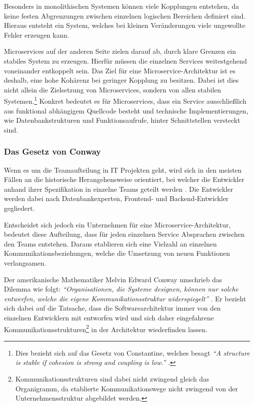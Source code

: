 Besonders in monolithischen Systemen können viele Kopplungen entstehen, da keine festen Abgrenzungen zwischen einzelnen logischen Bereichen definiert sind. Hieraus entsteht ein System, welches bei kleinen Veränderungen viele ungewollte Fehler erzeugen kann.

Microservices auf der anderen Seite zielen darauf ab, durch klare Grenzen ein stabiles System zu erzeugen. Hierfür müssen die einzelnen Services weitestgehend voneinander entkoppelt sein. Das Ziel für eine Microservice-Architektur ist es deshalb, eine hohe Kohärenz bei geringer Kopplung zu besitzen. Dabei ist dies nicht allein die Zielsetzung von Microservices, sondern von allen stabilen Systemen.\footnote{Dies bezieht sich auf das Gesetz von Constantine, welches besagt \textit{\enquote{A structure is stable if cohesion is strong and coupling is low.}} \parencite[][S. 43]{endres_handbook_2003}.} Konkret bedeutet es für Microservices, dass ein Service ausschließlich aus funktional abhängigem Quellcode besteht und technische Implementierungen, wie Datenbankstrukturen und Funktionsaufrufe, hinter Schnittstellen versteckt sind.

\subsubsection{Das Gesetz von Conway}
\label{sec:conway}

Wenn es um die Teamaufteilung in IT Projekten geht, wird sich in den meisten Fällen an die historische Herangehensweise orientiert, bei welcher die Entwickler anhand ihrer Spezifikation in einzelne Teams geteilt werden \parencite[vgl.][Kap. 4.2]{wolff_microservices_2018}.  Die Entwickler werden dabei nach Datenbankexperten, Frontend- und Backend-Entwickler gegliedert.

Entscheidet sich jedoch ein Unternehmen für eine Microservice-Architektur, bedeutet diese Aufteilung, dass für jeden einzelnen Service Absprachen zwischen den Teams entstehen. Daraus etablieren sich eine Vielzahl an einzelnen Kommunikationsbeziehungen, welche die Umsetzung von neuen Funktionen verlangsamen.

Der amerikanische Mathematiker Melvin Edward Conway umschrieb das Dilemma wie folgt:
\textit{\enquote{Organisationen, die Systeme designen, können nur solche entwerfen, welche die eigene Kommunikationsstruktur widerspiegelt}} \parencite{conway_conways_1968}.
Er bezieht sich dabei auf die Tatsache, dass die Softwarearchitektur immer von den einzelnen Entwicklern mit entworfen wird und sich daher eingefahrene Kommunikationsstrukturen\footnote{Kommunikationsstrukturen sind dabei nicht zwingend gleich das Organigramm, da etablierte Kommunikationswege nicht zwingend von der Unternehmensstruktur abgebildet werden.} in der Architektur wiederfinden lassen.


